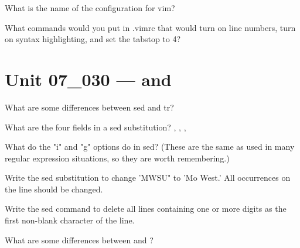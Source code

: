\documentclass[letterpaper,12pt]{exam}
\newcommand{\unit}{Unit 07}
\begin{document}
\begin {questions}
\begin{samepage}
\question What is the name of the configuration for vim?  {\color{blue}\fillin[][2cm]} 
\end{samepage}

\begin{samepage}
\question What commands would you put in .vimrc that would turn on line numbers, turn on syntax highlighting, and set the tabstop to 4? 

\end{samepage}

\section*{\unit\_030 ---  and } %

\begin{samepage}
\question What are some differences between sed and tr? 
\vspace{5mm}
\end{samepage}

\begin{samepage}
\question What are the four fields in a sed substitution? {\color{blue}\fillin[][2cm]}, {\color{blue}\fillin[][2cm]}, {\color{blue}\fillin[][2cm]}, {\color{blue}\fillin[][2cm]} 
\end{samepage}

\begin{samepage}
\question What do the "i" and "g" options do in sed?  (These are the same as used in many regular expression situations, so they are worth remembering.)
\vspace{5mm}
\end{samepage}

\begin{samepage}
\question Write the sed substitution to change 'MWSU" to 'Mo West.'  All occurrences on the line should be changed. 
\vspace{5mm}
\end{samepage}

\begin{samepage}
\question Write the sed command to delete all lines containing one or more digits as the first non-blank character of the line. 
\vspace{5mm}
\end{samepage}

\begin{samepage}
\question What are some differences between  and ? 


\end{samepage}
\end{questions}
\end{document}
